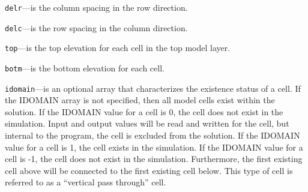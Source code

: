 \begin{description}
\item \texttt{delr}---is the column spacing in the row direction.

\item \texttt{delc}---is the row spacing in the column direction.

\item \texttt{top}---is the top elevation for each cell in the top model layer.

\item \texttt{botm}---is the bottom elevation for each cell.

\item \texttt{idomain}---is an optional array that characterizes the existence status of a cell.  If the IDOMAIN array is not specified, then all model cells exist within the solution.  If the IDOMAIN value for a cell is 0, the cell does not exist in the simulation.  Input and output values will be read and written for the cell, but internal to the program, the cell is excluded from the solution.  If the IDOMAIN value for a cell is 1, the cell exists in the simulation.  If the IDOMAIN value for a cell is -1, the cell does not exist in the simulation.  Furthermore, the first existing cell above will be connected to the first existing cell below.  This type of cell is referred to as a ``vertical pass through'' cell.

\end{description}


